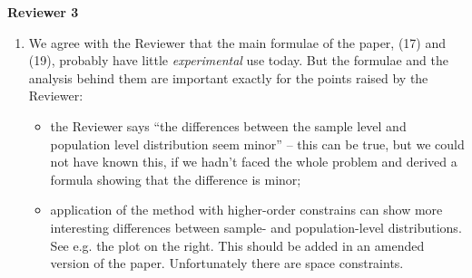 \documentclass{article}
\begin{document}
\textbf{Reviewer 3}
\begin{enumerate}
\item We agree with the Reviewer that the main formulae of the paper, (17)
  and (19), probably have little \emph{experimental} use today. But the
  formulae and the analysis behind them are important exactly for the
  points raised by the Reviewer:
  \begin{itemize}
  \item \begin{minipage}[t]{0.8\linewidth} the Reviewer says \enquote{the
        differences between the sample level and population level
        distribution seem minor} -- this can be true, but we could not have
      known this, if we hadn't faced the whole problem and derived a
      formula showing that the difference is minor;
    \end{minipage}
  \item
    \begin{minipage}[t]{0.8\linewidth}
      application of the method with higher-order constrains can show more
      interesting differences between sample- and population-level
      distributions. See e.g. the plot on the right. This should be added
      in an amended version of the paper. Unfortunately there are space
      constraints.
    \end{minipage}\hspace{\fill}


\end{itemize}
\end{enumerate}
\end{document}

